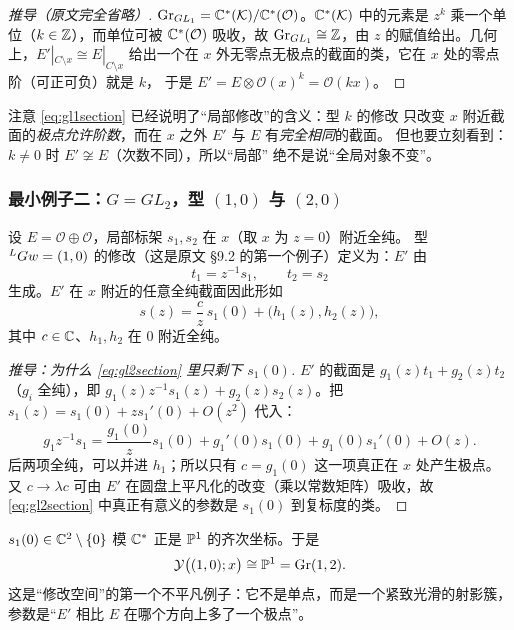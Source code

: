 \begin{proof}[推导（原文完全省略）]
$\mathrm{Gr}_{GL_1}=\mathbb{C}^*(\mathcal{K})/\mathbb{C}^*(\mathcal{O})$。$\mathbb{C}^*(\mathcal{K})$ 中的元素是
$z^k$ 乘一个单位（$k\in\mathbb{Z}$），而单位可被 $\mathbb{C}^*(\mathcal{O})$ 吸收，故
$\mathrm{Gr}_{GL_1}\cong\mathbb{Z}$，由 $z$ 的赋值给出。几何上，$E'|_{C\setminus x}\cong E|_{C\setminus x}$
给出一个在 $x$ 外无零点无极点的截面的类，它在 $x$ 处的零点阶（可正可负）就是 $k$，
于是 $E'=E\otimes\mathcal{O}(x)^k=\mathcal{O}(kx)$。
\end{proof}

注意 \eqref{eq:gl1section} 已经说明了“局部修改”的含义：型 $k$ 的修改
只改变 $x$ 附近截面的\emph{极点允许阶数}，而在 $x$ 之外 $E'$ 与 $E$ 有\emph{完全相同}的截面。
但也要立刻看到：$k\ne0$ 时 $E'\not\cong E$（次数不同），所以“局部”
绝不是说“全局对象不变”。\pB{}

\subsubsection{最小例子二：$G=GL_2$，型 $(1,0)$ 与 $(2,0)$}

设 $E=\mathcal{O}\oplus\mathcal{O}$，局部标架 $s_1,s_2$ 在 $x$（取 $x$ 为 $z=0$）附近全纯。
型 ${}^{L}G w=(1,0)$ 的修改（这是原文 §9.2 的第一个例子）定义为：$E'$ 由
\begin{equation}
t_1=z^{-1}s_1,\qquad t_2=s_2
\label{eq:gl2frame}
\end{equation}
生成。$E'$ 在 $x$ 附近的任意全纯截面因此形如
\begin{equation}
s(z)=\frac{c}{z}\,s_1(0)+\bigl(h_1(z),h_2(z)\bigr),
\label{eq:gl2section}
\end{equation}
其中 $c\in\mathbb{C}$、$h_1,h_2$ 在 $0$ 附近全纯。\pA{}

\begin{proof}[推导：为什么 \eqref{eq:gl2section} 里只剩下 $s_1(0)$]
$E'$ 的截面是 $g_1(z)t_1+g_2(z)t_2$（$g_i$ 全纯），即
$g_1(z)z^{-1}s_1(z)+g_2(z)s_2(z)$。把 $s_1(z)=s_1(0)+zs_1'(0)+O(z^2)$ 代入：
\begin{equation*}
g_1z^{-1}s_1
=\frac{g_1(0)}{z}s_1(0)+g_1'(0)s_1(0)+g_1(0)s_1'(0)+O(z).
\end{equation*}
后两项全纯，可以并进 $h_1$；所以只有 $c=g_1(0)$ 这一项真正在 $x$ 处产生极点。
又 $c\to\lambda c$ 可由 $E'$ 在圆盘上平凡化的改变（乘以常数矩阵）吸收，故
\eqref{eq:gl2section} 中真正有意义的参数是 $s_1(0)$ 到复标度的类。
\end{proof}

$s_1(0)\in\mathbb{C}^2\setminus\{0\}$ 模 $\mathbb{C}^*$ 正是 $\mathbb{P}^1$ 的齐次坐标。于是
\begin{equation}
\mathcal{Y}\bigl((1,0);x\bigr)\cong\mathbb{P}^1=\mathrm{Gr}(1,2).
\label{eq:y10}
\end{equation}
这是“修改空间”的第一个不平凡例子：它不是单点，而是一个紧致光滑的射影簇，
参数是“$E'$ 相比 $E$ 在哪个方向上多了一个极点”。\pA{}

